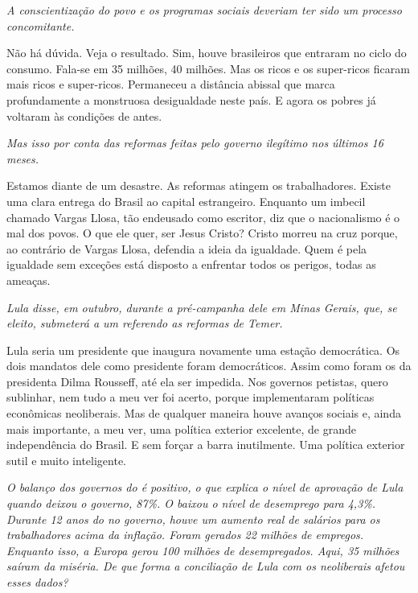 \itshape
A conscientização do povo e os programas sociais
deveriam ter sido um processo concomitante.

\normalfont 
Não há dúvida. Veja o resultado. Sim, houve brasileiros
que entraram no ciclo do consumo. Fala-se em 35 milhões, 40 milhões. Mas
os ricos e os super-ricos ficaram mais ricos e super-ricos. Permaneceu a
distância abissal que marca profundamente a monstruosa desigualdade
neste país. E agora os pobres já voltaram às condições de antes.

\itshape
Mas isso por conta das reformas feitas pelo governo
ilegítimo nos últimos 16 meses.

\normalfont 
Estamos diante de um desastre. As reformas atingem os
trabalhadores. Existe uma clara entrega do Brasil ao capital
estrangeiro. Enquanto um imbecil chamado Vargas Llosa, tão endeusado
como escritor, diz que o nacionalismo é o mal dos povos. O que ele quer,
ser Jesus Cristo? Cristo morreu na cruz porque, ao contrário de Vargas
Llosa, defendia a ideia da igualdade. Quem é pela igualdade sem exceções
está disposto a enfrentar todos os perigos, todas as ameaças.

\itshape
Lula disse, em outubro, durante a pré-campanha dele em
Minas Gerais, que, se eleito, submeterá a um referendo as reformas de
Temer.

\normalfont 
Lula seria um presidente que inaugura novamente uma
estação democrática. Os dois mandatos dele como presidente foram
democráticos. Assim como foram os da presidenta Dilma Rousseff, até ela
ser impedida. Nos governos petistas, quero sublinhar, nem tudo a meu ver
foi acerto, porque implementaram políticas econômicas neoliberais. Mas
de qualquer maneira houve avanços sociais e, ainda mais importante, a
meu ver, uma política exterior excelente, de grande independência do
Brasil. E sem forçar a barra inutilmente. Uma política exterior sutil e
muito inteligente.

\itshape
O balanço dos governos do  é positivo, o que explica
o nível de aprovação de Lula quando deixou o governo, 87\%. O  baixou
o nível de desemprego para 4,3\%. Durante 12 anos do  no governo,
houve um aumento real de salários para os trabalhadores acima da
inflação. Foram gerados 22 milhões de empregos. Enquanto isso, a Europa
gerou 100 milhões de desempregados. Aqui, 35 milhões saíram da miséria.
De que forma a conciliação de Lula com os neoliberais afetou esses
dados?

